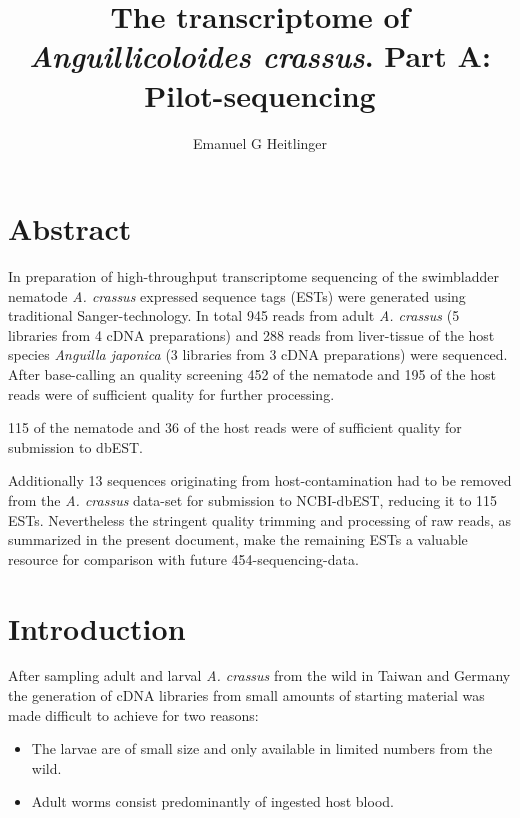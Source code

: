 \documentclass[12pt,a4paper]{article}
\begin{document}






\title{The transcriptome of \textit{Anguillicoloides crassus}. Part A:
  Pilot-sequencing} \author{Emanuel G Heitlinger} \date{}
\maketitle

\section*{Abstract}
In preparation of high-throughput transcriptome sequencing of the
swimbladder nematode \textit{A. crassus} expressed sequence tags
(ESTs) were generated using traditional Sanger-technology. In total
945 reads from adult \textit{A. crassus} (5
libraries from 4 cDNA preparations) and 288
reads from liver-tissue of the host species \textit{Anguilla japonica}
(3 libraries from 3 cDNA preparations) were sequenced. After
base-calling an quality screening 452 of the
nematode and 195 of the host reads were of
sufficient quality for further processing.

115 of the nematode and
36 of the host reads were of sufficient
quality for submission to dbEST.

Additionally 13 sequences originating
from host-contamination had to be removed from the \textit{A. crassus}
data-set for submission to NCBI-dbEST, reducing it to
115 ESTs. Nevertheless the stringent quality
trimming and processing of raw reads, as summarized in the present
document, make the remaining ESTs a valuable resource for comparison
with future 454-sequencing-data.

\section*{Introduction}

After sampling adult and larval \textit{A. crassus} from the wild in
Taiwan and Germany the generation of cDNA libraries from small amounts
of starting material was made difficult to achieve for two reasons:
\begin{itemize}
\item The larvae are of small size and only available in limited
  numbers from the wild.
\item Adult worms consist predominantly of ingested host blood.
\end{itemize}
\end{document}
